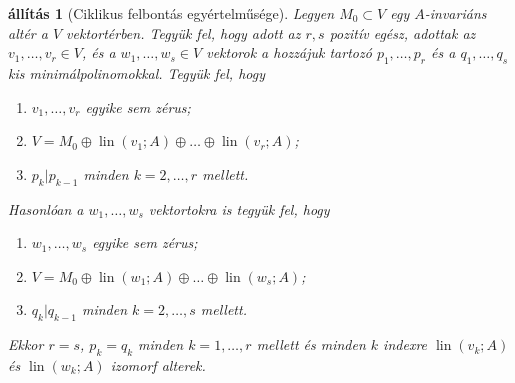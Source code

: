 \documentclass[a4paper, showtrims]{memoir}
\theoremstyle{plain}
\newtheorem{proposition}{állítás}[chapter]
\theoremstyle{remark}
\theoremstyle{definition}
\DeclareMathOperator{\lin}{lin}
\begin{document}
\begin{proposition}[Ciklikus felbontás egyértelműsége]
    Legyen $M_0\subset V$ egy $A$-invariáns altér a $V$ vektortérben.
    Tegyük fel, hogy adott az $r,s$ pozitív egész, adottak az 
    $v_1,\dots,v_r\in V$, és a $w_1,\dots,w_s\in V$ vektorok
    a hozzájuk tartozó $p_1,\dots,p_r$ és a $q_1,\dots,q_s$ kis minimálpolinomokkal.
    Tegyük fel, hogy 
    \begin{enumerate}
        \item $v_1,\dots,v_r$ egyike sem zérus;
        \item $V=M_0\oplus\lin\left( v_1;A \right)\oplus\ldots\oplus\lin\left( v_r;A \right)$;
        \item $p_{k}|p_{k-1}$ minden $k=2,\ldots,r$ mellett.
    \end{enumerate}
    Hasonlóan a $w_1,\dots,w_s$ vektortokra is tegyük fel, hogy 
    \begin{enumerate}
        \item $w_1,\dots,w_s$ egyike sem zérus;
        \item $V=M_0\oplus\lin\left( w_1;A \right)\oplus\ldots\oplus\lin\left( w_s;A \right)$;
        \item $q_{k}|q_{k-1}$ minden $k=2,\ldots,s$ mellett.
    \end{enumerate}
    Ekkor $r=s$, $p_k=q_k$ minden $k=1,\ldots,r$ mellett és minden $k$ indexre
    $\lin\left( v_k;A \right)$ és $\lin\left( w_k;A \right)$ izomorf alterek.
\end{proposition}
\end{document}
